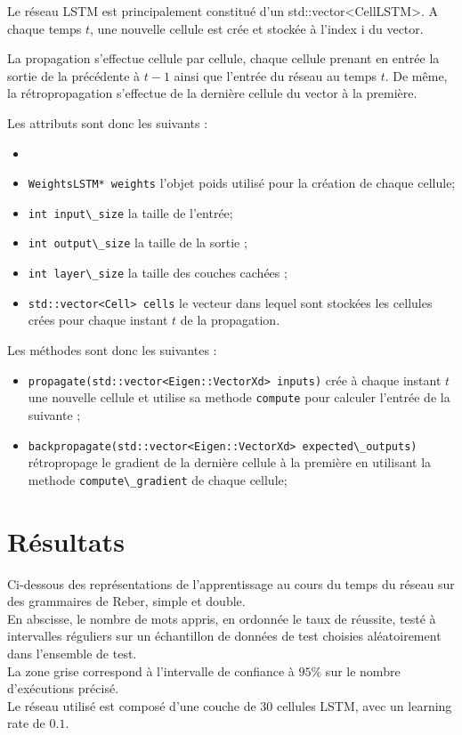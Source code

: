 Le réseau LSTM est principalement constitué d'un std::vector<CellLSTM>.
A chaque temps $t$, une nouvelle cellule est crée et stockée à l'index i du
vector.

\medskip

La propagation s'effectue cellule par cellule, chaque cellule prenant en entrée
la sortie de la précédente à $t-1$ ainsi que l'entrée du réseau au temps
$t$. De même, la rétropropagation s'effectue de la dernière cellule du vector à
la première.

\bigskip

Les attributs sont donc les suivants :

\begin{itemize}
  \item
  \item \verb+WeightsLSTM* weights+ l'objet poids utilisé pour la création de
    chaque cellule;
  \item \verb+int input\_size+ la taille de l'entrée;
  \item \verb+int output\_size+ la taille de la sortie ;
  \item \verb+int layer\_size+ la taille des couches cachées ;
  \item \verb+std::vector<Cell> cells+ le vecteur dans lequel sont stockées les
    cellules crées pour chaque instant $t$ de la propagation.
\end{itemize}

\bigskip

Les méthodes sont donc les suivantes :

\begin{itemize}
  \item \verb+propagate(std::vector<Eigen::VectorXd> inputs)+ crée à chaque
    instant $t$ une nouvelle cellule et utilise sa methode \verb+compute+
    pour calculer l'entrée de la suivante ;
  \item \verb+backpropagate(std::vector<Eigen::VectorXd> expected\_outputs)+
    rétropropage le gradient de la dernière cellule à la première en utilisant
    la methode \verb+compute\_gradient+ de chaque cellule;
\end{itemize}

\section{Résultats}
Ci-dessous des représentations de l'apprentissage au cours du temps du réseau sur des
grammaires de Reber, simple et double. \\
En abscisse, le nombre de mots appris, en ordonnée le taux de réussite, testé à
intervalles réguliers sur un échantillon de données de test choisies aléatoirement
dans l'ensemble de test. \\
La zone grise correspond à l'intervalle de confiance à $95\%$ sur le nombre d'exécutions
précisé.\\
Le réseau utilisé est composé d'une couche de 30 cellules LSTM, avec un learning
rate de $0.1$.

